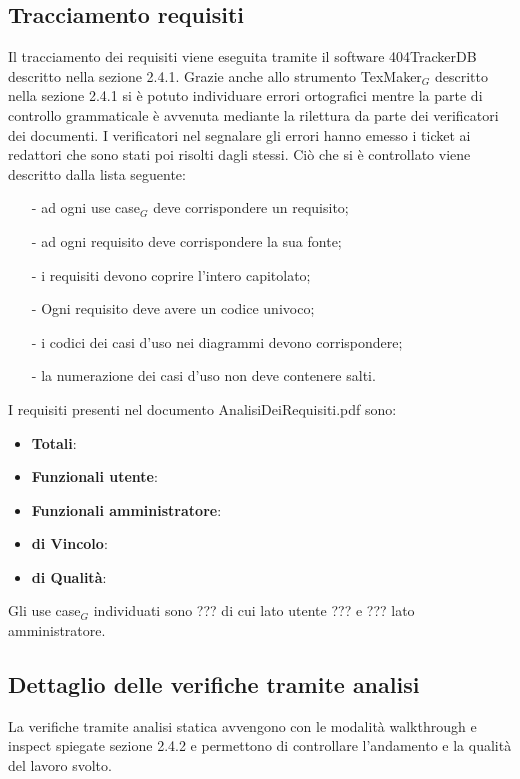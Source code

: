 \subsection{Tracciamento requisiti}
Il tracciamento dei requisiti viene eseguita tramite il software 404TrackerDB descritto nella sezione 2.4.1. 
Grazie anche allo strumento TexMaker$_G$ descritto nella sezione 2.4.1 si è potuto individuare errori ortografici mentre la parte di controllo grammaticale è avvenuta mediante la rilettura da parte dei verificatori dei documenti. I verificatori nel segnalare gli errori hanno emesso i ticket ai redattori che sono stati poi risolti dagli stessi.
Ciò che si è controllato viene descritto dalla lista seguente:
\begin{itemize}
\item[-] ad ogni use case$_G$ deve corrispondere un requisito;
\item[-] ad ogni requisito deve corrispondere la sua fonte;
\item[-] i requisiti devono coprire l'intero capitolato;
\item[-] Ogni requisito deve avere un codice univoco;
\item[-] i codici dei casi d'uso nei diagrammi devono corrispondere;
\item[-] la numerazione dei casi d'uso non deve contenere salti.
\end{itemize}
I requisiti presenti nel documento AnalisiDeiRequisiti.pdf sono:
\begin{itemize}
\item \textbf{Totali}: 
\item \textbf{Funzionali utente}:
\item \textbf{Funzionali amministratore}:
\item \textbf{di Vincolo}:
\item \textbf{di Qualità}:
\end{itemize}
Gli use case$_G$ individuati sono ???  di cui lato utente ??? e ??? lato  amministratore.
\subsection{Dettaglio delle verifiche tramite analisi}
La verifiche tramite analisi statica avvengono con le modalità walkthrough e inspect spiegate sezione 2.4.2 e permettono di controllare l'andamento e la qualità del lavoro svolto.
